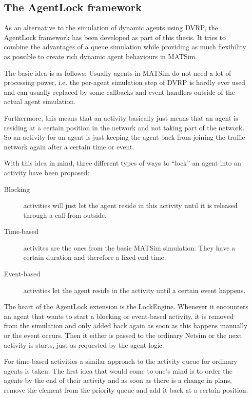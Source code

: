 \subsection{The AgentLock framework}

As an alternative to the simulation of dynamic agents using DVRP, the AgentLock
framework has been developed as part of this thesis. It tries to combine the advantages
of a queue simulation while providing as much flexibility as possible to create
rich dynamic agent behaviours in MATSim.

The basic idea is as follows: Usually agents in MATSim do not need a lot of processing
power, i.e. the per-agent simulation step of DVRP is hardly ever used and can usually
replaced by some callbacks and event handlers outside of the actual agent simulation.

Furthermore, this means that an activity basically just means that an agent is residing
at a certain position in the network and not taking part of the network. So an
activity for an agent is just keeping the agent back from joining the traffic network
again after a certain time or event.

With this idea in mind, three different types of ways to ``lock'' an agent into
an activity have been proposed:

\begin{description}
    \item[Blocking] activities will just let the agent reside in this activity until
    it is released through a call from outside.
    \item[Time-based] activites are the ones from the basic MATSim simulation: They
    have a certain duration and therefore a fixed end time.
    \item[Event-based] activities let the agent reside in the activity until a certain
    event happens.
\end{description}

The heart of the AgentLock extension is the LockEngine. Whenever it encounters an
agent that wants to start a blocking or event-based activity, it is removed from
the simulation and only added back again as soon as this happens manually or the
event occurs. Then it either is passed to the ordinary Netsim or the next activity
is starts, just as requested by the agent logic.

For time-based activities a similar approach to the activity queue for ordinary
agents is taken. The first idea that would come to one's mind is to order the
agents by the end of their activity and as soon as there is a change in plans,
remove the element from the priority queue and add it back at a certain position.


